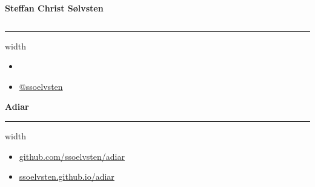 \documentclass[english, aspectratio=169]{beamer}
\begin{document}
\blankframe

\begin{frame}
  {\Large \textbf{Steffan Christ Sølvsten}}
  \begin{columns}
    \begin{column}{0.4\linewidth}
      \vspace{1pt} {\hrule width\linewidth}

      \vspace{5pt}

      \begin{itemize}
      \item[\faIcon{envelope}] 
      \item[\faIcon{twitter}] \href{https://www.twitter.com/ssoelvsten}{@ssoelvsten}
      \end{itemize}

      \vspace{10pt}

      {\Large \textbf{Adiar}}
      \vspace{1pt} {\hrule width\linewidth}

      \vspace{5pt}

      \begin{itemize}
      \item[\faIcon{code}]
        \href{http://github.com/ssoelvsten/adiar}{github.com/ssoelvsten/adiar}
      \item[\faIcon{book}\hspace{2pt}]
        \href{http://ssoelvsten.github.io/adiar}{ssoelvsten.github.io/adiar}
      \end{itemize}

      \vspace{10pt}


\end{column}
\end{columns}
\end{frame}
\end{document}

